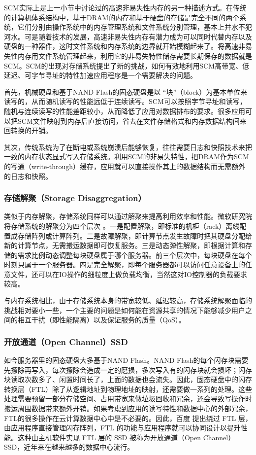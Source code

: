 SCM实际上是上一小节中讨论过的高速非易失性内存的另一种描述方式。在传统的计算机体系结构中，基于DRAM的内存和基于硬盘的存储是完全不同的两个系统，它们分别由操作系统中的内存管理系统和文件系统分别管理，基本上井水不犯河水。可是随着技术的发展，高速非易失性内存有潜力成为可以同时代替内存以及硬盘的一种器件，这时文件系统和内存系统的边界就开始模糊起来了。将高速非易失性内存用文件系统管理起来，利用它的非易失特性储存需要长期保存的数据就是SCM。SCM的出现对存储系统提出了新的挑战，如何有效地利用SCM高带宽、低延迟、可字节寻址的特性加速应用程序是一个需要解决的问题。

首先，机械硬盘和基于NAND Flash的固态硬盘是以 ``块''（block）为基本单位来读写的，从而随机读写的性能远低于连续读写。SCM可以按照字节寻址和读写，随机与连续读写的性能差距较小，从而降低了应用对数据排布的要求。很多应用可以把SCM文件映射到内存后直接访问，省去在文件存储格式和内存数据结构间来回转换的开销。

其次，传统系统为了在断电或系统崩溃后能够恢复，往往需要日志和快照技术来把一致的内存状态显式写入存储系统。利用SCM的非易失特性，把DRAM作为SCM的写通（write-through）缓存，应用就可以直接操作其上的数据结构而无需额外的日志和快照。

\subsubsection{存储解聚（Storage Disaggregation）}

类似于内存解聚，存储系统同样可以通过解聚来提高利用效率和性能。微软研究院将存储系统的解聚分为四个层次 \cite{legtchenko2017understanding}。一是配置解聚，即标准的机柜（rack）离线配置成存储阵列或计算阵列。二是故障解聚，即计算节点发生故障时把其硬盘分配给新的计算节点，无需搬运数据即可恢复服务。三是动态弹性解聚，即根据计算和存储的需求比例动态调整每块硬盘属于哪个服务器。前三个层次中，每块硬盘在每个时刻只属于一个服务器。四是完全解聚，即每个服务器都可以访问任意设备上的任意文件，还可以在IO操作的细粒度上做负载均衡，当然这对IO控制器的负载要求较高。

与内存系统相比，由于存储系统本身的带宽较低、延迟较高，存储系统解聚面临的挑战相对要小一些，一个主要的问题是如何能在资源共享的情况下能够减少用户之间的相互干扰（即性能隔离）以及保证服务的质量（QoS）。

\subsubsection{开放通道（Open Channel）SSD}

如今服务器里的固态硬盘大多基于NAND Flash。NAND Flash的每个闪存块需要先擦除再写入，每次擦除会造成一定的磨损，多次写入有的闪存块就会损坏；闪存块读取次数多了、闲置时间长了，上面的数据也会流失。因此，固态硬盘中的闪存转换层（FTL）除了从逻辑地址到物理地址的映射，还需要做一系列的处理。这些处理需要预留一部分存储空间、占用带宽来做垃圾回收和冗余，还会导致写操作时搬运周围数据带来额外开销。如果考虑到应用的读写特性和数据中心的外部冗余，FTL的很多操作在云计算数据中心中是不必要的。因此，百度 \cite{ouyang2013active} 提出绕过 FTL 层，由应用程序直接管理闪存阵列，FTL 的功能与应用程序就可以协同设计以提升性能。这种由主机软件实现 FTL 层的 SSD 被称为开放通道（Open Channel）SSD，近年来在越来越多的数据中心流行。

